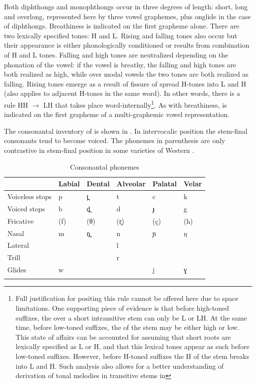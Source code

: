 \documentclass[output=paper
,newtxmath
,modfonts
,nonflat]{langsci/langscibook}
\begin{document}
Both diphthongs and monophthongs occur in three degrees of length: short, long and overlong, represented here by three vowel graphemes, plus onglide in the case of diphthongs. Breathiness is indicated on the first grapheme alone. There are two lexically specified tones:  H and L.  Rising and falling tones also occur but their appearance is either phonologically conditioned or results from combination of H and L tones.  Falling and high tones are neutralized depending on the phonation of the vowel: if the vowel is breathy, the falling and high tones are both realized as high, while over modal vowels the two tones are both realized as falling.  Rising tones emerge as a result of fissure of spread H-tones into L and H (also applies to adjacent H-tones in the same word).  In other words, there is a rule HH $\rightarrow$ LH that takes place word-internally\footnote{Full justification for positing this rule cannot be offered here due to space limitations.  One supporting piece of evidence is that before high-toned suffixes, the  over a short intransitive stem can only be L or LH. At the same time, before low-toned suffixes, the  of the stem may be either high or low.  This state of affairs can be accounted for assuming that short roots are lexically specified as L or H, and that this lexical tones appear as such before low-toned suffixes.  However, before H-toned suffixes the H of the stem breaks into L and H.  Such analysis also allows for a better understanding of derivation of tonal melodies in transitive stems in }. As with breathiness,  is indicated on the first grapheme of a multi-graphemic vowel representation.

The consonantal inventory of  is shown in .  In intervocalic position the stem-final consonants tend to become voiced.  The phonemes in parenthesis are only contrastive in stem-final position in some varieties of Western .


\begin{table}
\begin{tabularx}{\textwidth}{XXXXXX}
\lsptoprule
& \bfseries Labial & \bfseries Dental & \bfseries Alveolar & \bfseries Palatal & \bfseries Velar\\
\midrule 
Voiceless stops & p & t̪ & t & c & k\\
Voiced stops & b & d̪ & d & ɟ & g\\
Fricative & (f) & (θ) & (r̥) & (ç) & (h)\\
Nasal & m & n̪ & n & ɲ & ŋ\\
Lateral &  &  & l &  & \\
Trill &  &  & r &  & \\
Glides & w &  &  & j & ɣ\\
\lspbottomrule
\end{tabularx}
\caption{Consonantal phonemes}
\label{tab:monich:2}
\end{table}
\end{document}
